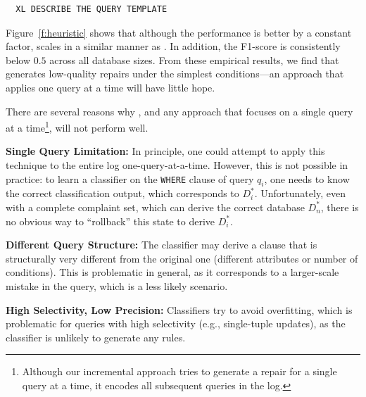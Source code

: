 \begin{verbatim}
  XL DESCRIBE THE QUERY TEMPLATE
\end{verbatim}

Figure~\ref{f:heuristic} shows that although the performance is better by  a constant factor,
\dt scales in a similar manner as \sys.  In addition, the F1-score is consistently below $0.5$ across all database sizes.
From these empirical results, we find that \dt generates low-quality repairs under the simplest conditions---an approach
that applies \dt one query at a time will have little hope.


There are several reasons why \dt, and any approach that focuses on a single query at a 
time\footnote{Although our incremental approach tries to generate a repair for a single
query at a time, it encodes all subsequent queries in the log.}, will not perform well.

\begin{itemize}[itemsep=1pt, leftmargin=5mm]
    
\textbf{Single Query Limitation: }
In principle, one could attempt to apply this technique to the
entire log one-query-at-a-time. However, this is not possible in
practice: to learn a classifier on the \texttt{WHERE} clause of query
$q_i$, one needs to know the correct classification output, which
corresponds to $D_i^*$. Unfortunately, even with a complete complaint
set, which can derive the correct database $D_n^*$, there is no
obvious way to ``rollback'' this state to derive $D_i^*$.

\textbf{Different Query Structure: } 
The classifier may derive a clause that is structurally very
different from the original one (different attributes or number of
conditions). This is problematic in general, as it corresponds to a
larger-scale mistake in the query, which is a less likely scenario.

\textbf{High Selectivity, Low Precision: }
Classifiers try to avoid overfitting, which is problematic for
queries with high selectivity (e.g., single-tuple updates), as the
classifier is unlikely to generate any rules.

\end{itemize}


